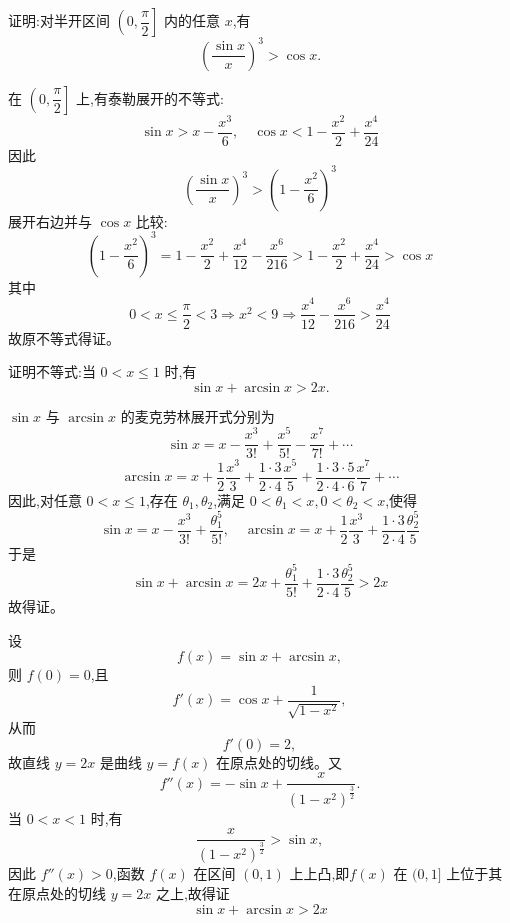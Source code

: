 \begin{questions}
    \question 证明:对半开区间 $\left(0, \dfrac{\pi}{2}\right]$ 内的任意 $x$,有
    \[
    \left(\frac{\sin x}{x}\right)^3 > \cos x.
    \]
    \begin{solution}
        在 $\left(0, \dfrac{\pi}{2}\right]$ 上,有泰勒展开的不等式:
        \[
        \sin x > x - \frac{x^3}{6}, \quad \cos x < 1 - \frac{x^2}{2} + \frac{x^4}{24}
        \]
        因此
        \[
        \left(\frac{\sin x}{x}\right)^3 > \left(1 - \frac{x^2}{6}\right)^3
        \]
        展开右边并与 $\cos x$ 比较:
        \[
        \left(1 - \frac{x^2}{6}\right)^3 = 1 - \frac{x^2}{2} + \frac{x^4}{12} - \frac{x^6}{216} > 1 - \frac{x^2}{2} + \frac{x^4}{24} > \cos x
        \]
        其中
        \[
        0 < x \le \frac{\pi}{2} < 3 \Rightarrow x^2 < 9   \Rightarrow \frac{x^4}{12} - \frac{x^6}{216} > \frac{x^4}{24} 
        \]
        故原不等式得证。
    \end{solution}

    \question 证明不等式:当 $0 < x \le 1$ 时,有
    \[
    \sin x + \arcsin x > 2x.
    \]
    \begin{solution}
        $\sin x$ 与 $\arcsin x$ 的麦克劳林展开式分别为
        \[
        \sin x = x - \frac{x^3}{3!} + \frac{x^5}{5!} - \frac{x^7}{7!} + \cdots
        \]
        \[
        \arcsin x = x + \frac{1}{2}\frac{x^3}{3} + \frac{1\cdot 3}{2\cdot 4}\frac{x^5}{5} + \frac{1\cdot 3\cdot 5}{2\cdot 4\cdot 6}\frac{x^7}{7} + \cdots
        \]
        因此,对任意 $0 < x \le 1$,存在 $\theta_1,\theta_2$,满足 $0<\theta_1<x,0<\theta_2<x$,使得
        \[
        \sin x = x - \frac{x^3}{3!} + \frac{\theta_1^5}{5!},\quad \arcsin x = x + \frac{1}{2}\frac{x^3}{3} + \frac{1\cdot 3}{2\cdot 4}\frac{\theta_2^5}{5}
        \]
        于是
        \[
        \sin x + \arcsin x = 2x + \frac{\theta_1^5}{5!} + \frac{1\cdot 3}{2\cdot 4}\frac{\theta_2^5}{5} > 2x
        \]
        故得证。
    \end{solution}
    \begin{solution}
        设
        \[
        f(x) = \sin x + \arcsin x,
        \]
        则 $f(0)=0$,且
        \[
        f'(x) = \cos x + \frac{1}{\sqrt{1-x^2}},
        \]
        从而
        \[
        f'(0) = 2,
        \]
        故直线 $y=2x$ 是曲线 $y=f(x)$ 在原点处的切线。又
        \[
        f''(x) = -\sin x + \frac{x}{(1-x^2)^{\frac{3}{2}}}.
        \]
        当 $0<x<1$ 时,有
        \[
        \frac{x}{(1-x^2)^{\frac{3}{2}}} > \sin x,
        \]
        因此 $f''(x)>0$,函数 $f(x)$ 在区间 $(0,1)$ 上上凸,即$f(x)$ 在 $(0,1]$ 上位于其在原点处的切线 $y=2x$ 之上,故得证
        \[
        \sin x + \arcsin x > 2x
        \]
    \end{solution}


\end{questions}
